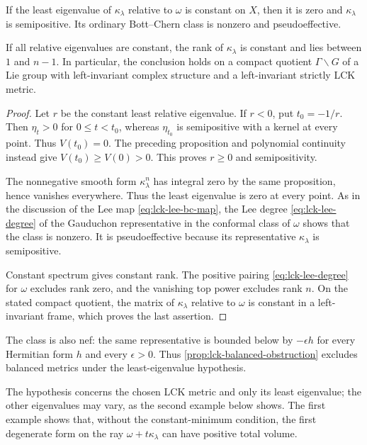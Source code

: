 \begin{theorem}\label{lck:constant-minimum-lee}
If the least eigenvalue of $\kappa_\lambda$ relative to
$\omega$ is constant on $X$, then it is zero and
$\kappa_\lambda$ is semipositive. Its ordinary Bott--Chern
class is nonzero and pseudoeffective.

If all relative eigenvalues are constant, the rank of
$\kappa_\lambda$ is constant and lies between $1$ and $n-1$. In
particular, the conclusion holds on a compact quotient
$\Gamma\backslash G$ of a Lie group with left-invariant complex
structure and a left-invariant strictly LCK metric.
\end{theorem}
\begin{proof}
Let $r$ be the constant least relative eigenvalue. If $r<0$,
put $t_0=-1/r$. Then $\eta_t>0$ for $0\leq t<t_0$,
whereas $\eta_{t_0}$ is semipositive with a kernel at every
point. Thus $V(t_0)=0$. The preceding proposition and
polynomial continuity instead give $V(t_0)\geq V(0)>0$.
This proves $r\geq0$ and semipositivity.

The nonnegative smooth form $\kappa_\lambda^n$ has integral
zero by the same proposition, hence vanishes everywhere.
Thus the least eigenvalue is zero at every point. As in the
discussion of the Lee map \eqref{eq:lck-lee-bc-map}, the Lee
degree \eqref{eq:lck-lee-degree} of the Gauduchon representative
in the conformal class of $\omega$ shows that the class is
nonzero. It is pseudoeffective because its representative
$\kappa_\lambda$ is semipositive.

Constant spectrum gives constant rank. The positive pairing
\eqref{eq:lck-lee-degree} for $\omega$ excludes rank zero, and
the vanishing top power excludes rank $n$. On the stated compact
quotient, the matrix of $\kappa_\lambda$ relative to $\omega$ is
constant in a left-invariant frame, which proves the last assertion.
\end{proof}

The class is also nef: the same representative is bounded below by
$-\epsilon h$ for every Hermitian form $h$ and every $\epsilon>0$.
Thus \cref{prop:lck-balanced-obstruction} excludes balanced metrics
under the least-eigenvalue hypothesis.

The hypothesis concerns the chosen LCK metric and only its least
eigenvalue; the other eigenvalues may vary, as the second example
below shows. The first example shows that, without the
constant-minimum condition, the first degenerate form on the ray
$\omega+t\kappa_\lambda$ can have positive total volume.

